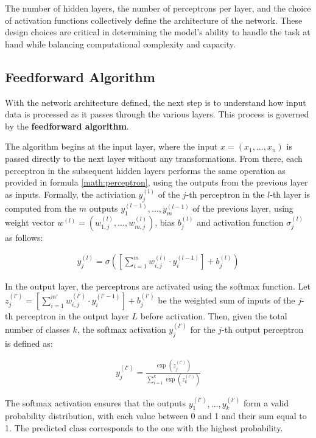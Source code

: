 The number of hidden layers, the number of perceptrons per layer,
and the choice of activation functions collectively define the architecture of the network.
These design choices are critical in determining the model's ability to handle the task at hand
while balancing computational complexity and capacity.

\subsection{Feedforward Algorithm}
\label{sec:feedforward}
With the network architecture defined,
the next step is to understand how input data is processed as it passes through the various layers.
This process is governed by the \textbf{feedforward algorithm}.

The algorithm begins at the input layer,
where the input $x = (x_1, ..., x_n)$ is passed directly to the next layer without any transformations. 
From there, each perceptron in the subsequent hidden layers
performs the same operation as provided in formula \ref{math:perceptron},
using the outputs from the previous layer as inputs.
Formally, the activiation $y_j^{(l)}$ of the $j$-th perceptron in the $l$-th layer
is computed from the $m$ outputs $y_1^{(l-1)}, ..., y_m^{(l-1)}$ of the previous layer,
using weight vector $w^{(l)} = (w_{1,j}^{(l)}, ..., w_{m,j}^{(l)})$, bias $b_j^{(l)}$
and activation function $\sigma_j^{(l)}$ as follows:

\begin{align}
	y_j^{(l)} = \sigma\left(\left[\sum_{i = 1}^m w_{i,j}^{(l)} \cdot y_i^{(l-1)} \right] + b_j^{(l)}\right)
\end{align}

In the output layer, the perceptrons are activated using the softmax function.
Let $z_j^{(l')} = \left[\sum_{i = 1}^{m'} w_{i,j}^{(l')} \cdot y_i^{(l'-1)} \right] + b_j^{(l')}$ be 
the weighted sum of inputs of the $j$-th perceptron in the output layer $L$ before activation.
Then, given the total number of classes $k$, 
the softmax activation $y_j^{(l')}$ for the $j$-th output perceptron is defined as:

\begin{align}
  y_j^{(l')} = \frac{\exp(z_j^{(l')})}{\sum_{i=1}^k \exp(z_k^{(l')})}
\end{align}

The softmax activation ensures that the outputs $y_1^{(l')},...,y_k^{(l')}$
form a valid probability distribution,
with each value between 0 and 1 and their sum equal to 1.
The predicted class corresponds to the one with the highest probability.

